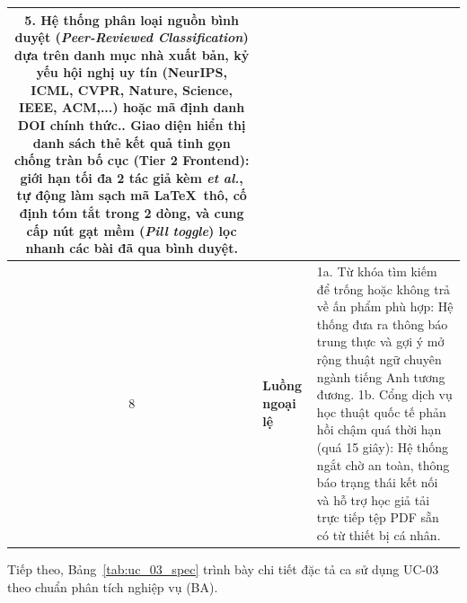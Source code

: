 \begin{table}[htbp]
\begin{tabular}{|c|>{\raggedright\arraybackslash}p{2.6cm}|>{\raggedright\arraybackslash}p{10.2cm}|}
5. Hệ thống phân loại nguồn bình duyệt (\textit{Peer-Reviewed Classification}) dựa trên danh mục nhà xuất bản, kỷ yếu hội nghị uy tín (NeurIPS, ICML, CVPR, Nature, Science, IEEE, ACM,...) hoặc mã định danh DOI chính thức.\newline
6. Giao diện hiển thị danh sách thẻ kết quả tinh gọn chống tràn bố cục (Tier 2 Frontend): giới hạn tối đa 2 tác giả kèm \textit{et al.}, tự động làm sạch mã \LaTeX\ thô, cố định tóm tắt trong 2 dòng, và cung cấp nút gạt mềm (\textit{Pill toggle}) lọc nhanh các bài đã qua bình duyệt. \\ \hline
8 & \textbf{Luồng ngoại lệ} & 
1a. Từ khóa tìm kiếm để trống hoặc không trả về ấn phẩm phù hợp: Hệ thống đưa ra thông báo trung thực và gợi ý mở rộng thuật ngữ chuyên ngành tiếng Anh tương đương.\newline
1b. Cổng dịch vụ học thuật quốc tế phản hồi chậm quá thời hạn (quá 15 giây): Hệ thống ngắt chờ an toàn, thông báo trạng thái kết nối và hỗ trợ học giả tải trực tiếp tệp PDF sẵn có từ thiết bị cá nhân. \\ \hline
\end{tabular}
\end{table}

Tiếp theo, Bảng~\ref{tab:uc_03_spec} trình bày chi tiết đặc tả ca sử dụng UC-03 theo chuẩn phân tích nghiệp vụ (BA).

